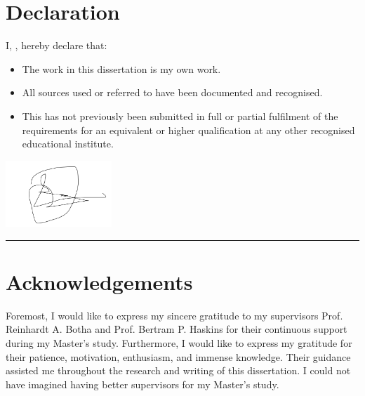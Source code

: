 \chapter{Declaration}

I, \thethesisauthor, hereby declare that:

\begin{itemize}

\item The work in this dissertation is my own work.

\item All sources used or referred to have been documented and
recognised.

\item This \MakeLowercase{\thethesistype} has not previously been
submitted in full or partial fulfilment of the requirements for
an equivalent or higher qualification at any other recognised
educational institute.

\end{itemize}

\includegraphics[width=40mm]{./figures/signature}
\rule[0mm]{0mm}{40mm}

\rule[0mm]{70mm}{0.3mm}

\thethesisauthor



\chapter{Acknowledgements}

Foremost, I would like to express my sincere gratitude to my supervisors Prof. Reinhardt A. Botha and Prof. Bertram P. Haskins for their continuous support during my Master's study. Furthermore, I would like to express my gratitude for their patience, motivation, enthusiasm, and immense knowledge. Their guidance assisted me throughout the research and writing of this dissertation. I could not have imagined having better supervisors for my Master's study.

